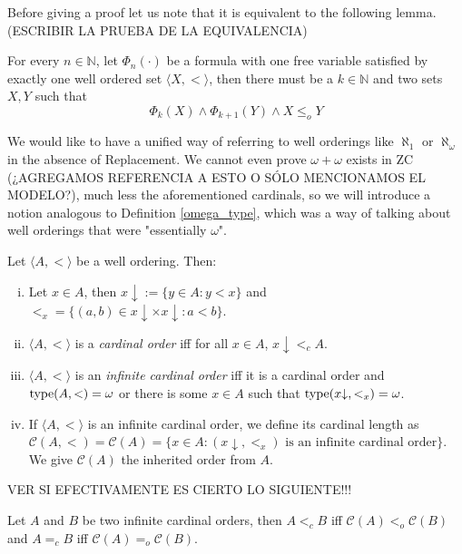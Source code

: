 Before giving a proof let us note that it is equivalent to the following lemma. (ESCRIBIR LA PRUEBA DE LA EQUIVALENCIA)

\begin{lemma}
	\label{easier_hartogs_class}
	For every $n\in\mathbb{N}$, let $\Phi_n(\cdot)$ be a formula with one free variable satisfied by exactly one well ordered set $\langle X,< \rangle$, then there must be a $k \in \mathbb{N}$ and two sets $X,Y$ such that 
	\[
		\Phi_k (X) \land \Phi_{k+1} (Y) \land X \leq_o Y
	\]
\end{lemma}

We would like to have a unified way of referring to well orderings like $\aleph_1$ or $\aleph_\omega$ in the absence of Replacement. We cannot even prove $\omega+\omega$ exists in ZC (¿AGREGAMOS REFERENCIA A ESTO O SÓLO MENCIONAMOS EL MODELO?), much less the aforementioned cardinals, so we will introduce a notion analogous to Definition \ref{omega_type}, which was a way of talking about well orderings that were "essentially $\omega$".

\begin{definition}
	Let $\langle A,< \rangle$ be a well ordering. Then:
	\begin{enumerate}[(i)]
		\item Let $x\in A$, then $x{\downarrow} := \{y\in A: y<x\}$ and $<_x = \{(a,b) \in x{\downarrow}\times x{\downarrow} : a<b\}$.
		\item $\langle A,< \rangle$ is a \emph{cardinal order} iff for all $x\in A$, $x{\downarrow} <_c A$.
		\item $\langle A,< \rangle$ is an \emph{infinite cardinal order} iff it is a cardinal order and ${\operatorname{type}(A,<)} = \omega$ or there is some $x\in A$ such that $\operatorname{type}(x{\downarrow},<_x) = \omega$.
		\item If $\langle A,< \rangle$ is an infinite cardinal order, we define its cardinal length as $\mathcal{C}(A,<) = \mathcal{C}(A) = \{x\in A: (x{\downarrow},<_x) \text{ is an infinite cardinal order}\}$. We give $\mathcal{C}(A)$ the inherited order from $A$.
	\end{enumerate}
\end{definition}

VER SI EFECTIVAMENTE ES CIERTO LO SIGUIENTE!!!

\begin{lemma}
	\label{weak_aleph}
	Let $A$ and $B$ be two infinite cardinal orders, then $A <_c B$ iff $\mathcal{C}(A) <_o \mathcal{C}(B)$ and $A =_c B$ iff $\mathcal{C}(A) =_o \mathcal{C}(B)$.
\end{lemma}

